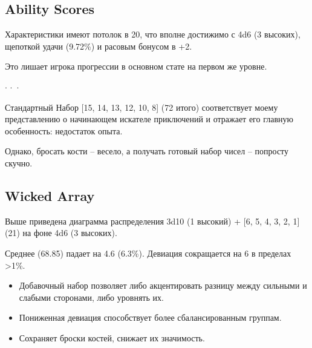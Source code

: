 \documentclass[a4paper,11pt]{book}
\newcommand{\sans}[1]
    {{\AlegreyaSansOsF#1}}
\newcommand{\threestars}{\begin{center}\vspace{-12pt}$ {\cdot}\,{\cdot}\,{\cdot} $\vspace{-7pt}\end{center}}
\begin{document}
\begin{multicols}{2}

\section{Ability Scores}

Характеристики имеют потолок в 20, что вполне достижимо с 4d6 (3 высоких), щепоткой удачи (9.72\%) и расовым бонусом в +2.

Это лишает игрока прогрессии в основном стате на первом же уровне.

\threestars

Стандартный Набор [15, 14, 13, 12, 10, 8] (72 итого) соответствует моему представлению о начинающем искателе приключений и отражает его главную особенность: недостаток опыта.

Однако, бросать кости -- весело, а получать готовый набор чисел -- попросту скучно.

\subsection{Wicked Array}

Выше приведена диаграмма распределения 3d10 (1 высокий) + [6, 5, 4, 3, 2, 1] (21) на фоне 4d6 (3 высоких).

Среднее (68.85) падает на 4.6 (6.3\%). Девиация сокращается на 6 в пределах >1\%.

\begin{itemize}
    \item Добавочный набор позволяет либо акцентировать разницу между сильными и слабыми сторонами, либо уровнять их.
    \item Пониженная девиация способствует более сбалансированным группам.
    \item Сохраняет броски костей, снижает их значимость.
\end{itemize}


\end{multicols}
\end{document}
